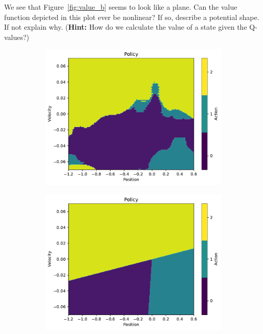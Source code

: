 \documentclass[11pt,addpoints,answers]{exam}
\begin{document}
\begin{questions}
    \begin{your_solution}[title=Answer,height=5cm,width=15cm]
    \end{your_solution}

    \question[2] We see that Figure~\ref{fig:value_b} seems to look like a plane. Can the value function depicted in this plot ever be nonlinear? If so, describe a potential shape. If not explain why. (\textbf{Hint:} How do we calculate the value of a state given the Q-values?)

    \begin{your_solution}[title=Answer,height=5cm,width=15cm]
    \end{your_solution}
    
    
        
    
    \begin{figure}[H]
        \centering
        \begin{subfigure}{0.5\textwidth}
            \includegraphics[width=\linewidth]{figs/policy_A.pdf}
            \caption{}
            \label{fig:policy_a}
        \end{subfigure}%
        \begin{subfigure}{0.5\textwidth}
            \includegraphics[width=\linewidth]{figs/policy_B.pdf}

\end{subfigure}
\end{figure}
\end{questions}
\end{document}
